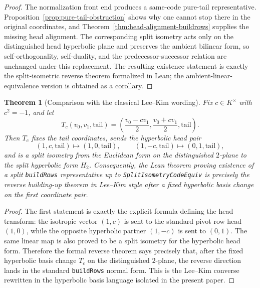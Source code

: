 \documentclass[12pt]{article}
\newtheorem{theorem}{Theorem}[section]
\newenvironment{blueblock}{\begingroup\color{blue}}{\endgroup}
\begin{document}
\begin{blueblock}
\begin{proof}
The normalization front end produces a same-code pure-tail representative. Proposition~\ref{prop:pure-tail-obstruction} shows why one cannot stop there in the original coordinates, and Theorem~\ref{thm:head-alignment-buildrows} supplies the missing head alignment. The corresponding split isometry acts only on the distinguished head hyperbolic plane and preserves the ambient bilinear form, so self-orthogonality, self-duality, and the predecessor-successor relation are unchanged under this replacement. The resulting existence statement is exactly the split-isometric reverse theorem formalized in Lean; the ambient-linear-equivalence version is obtained as a corollary.
\end{proof}
\end{blueblock}

\begin{blueblock}
\begin{theorem}[Comparison with the classical Lee--Kim wording]
\label{thm:split-isometry-comparison}
Fix \(c \in K^\times\) with \(c^2=-1\), and let
\[
T_c(v_0,v_1,\mathrm{tail})
=
\left(\frac{v_0-cv_1}{2},\frac{v_0+cv_1}{2},\mathrm{tail}\right).
\]
Then \(T_c\) fixes the tail coordinates, sends the hyperbolic head pair
\[
(1,c,\mathrm{tail}) \longmapsto (1,0,\mathrm{tail}),
\qquad
(1,-c,\mathrm{tail}) \longmapsto (0,1,\mathrm{tail}),
\]
and is a split isometry from the Euclidean form on the distinguished \(2\)-plane to the split hyperbolic form \(H_2\). Consequently, the Lean theorem proving existence of a split \texttt{buildRows} representative up to \texttt{SplitIsometryCodeEquiv} is precisely the reverse building-up theorem in Lee--Kim style after a fixed hyperbolic basis change on the first coordinate pair.
\end{theorem}

\begin{proof}
The first statement is exactly the explicit formula defining the head transform: the isotropic vector \((1,c)\) is sent to the standard pivot row head \((1,0)\), while the opposite hyperbolic partner \((1,-c)\) is sent to \((0,1)\). The same linear map is also proved to be a split isometry for the hyperbolic head form. Therefore the formal reverse theorem says precisely that, after the fixed hyperbolic basis change \(T_c\) on the distinguished \(2\)-plane, the reverse direction lands in the standard \texttt{buildRows} normal form. This is the Lee--Kim converse rewritten in the hyperbolic basis language isolated in the present paper.
\end{proof}
\end{blueblock}
\end{document}
